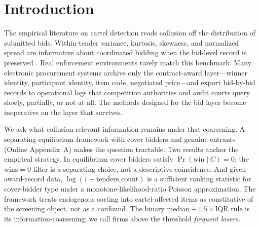 \section{Introduction}
\label{sec:intro}

The empirical literature on cartel detection reads collusion off
the distribution of submitted bids. Within-tender variance,
kurtosis, skewness, and normalized spread are informative about
coordinated bidding when the bid-level record is preserved
\citep{porter1993detection,bajari2003deciding,imhof2019detecting,wallimann2023machine}.
Real enforcement environments rarely match this benchmark. Many
electronic procurement systems archive only the contract-award
layer---winner identity, participant identity, item code,
negotiated price---and export bid-by-bid records to operational
logs that competition authorities and audit courts query slowly,
partially, or not at all. The methods designed for the bid layer
become inoperative on the layer that survives.

We ask what collusion-relevant information remains under that
coarsening. A separating-equilibrium framework with cover
bidders and genuine entrants (Online Appendix~A) makes the
question tractable. Two results anchor the empirical strategy.
In equilibrium cover bidders satisfy
$\Pr(\text{win}\mid C)=0$: the $\text{wins}=0$ filter is a
separating choice, not a descriptive coincidence. And given
award-record data, $\log(1+\text{tenders\_count})$ is a
sufficient ranking statistic for cover-bidder type under a
monotone-likelihood-ratio Poisson approximation. The framework
treats endogenous sorting into cartel-affected items as
constitutive of the screening object, not as a confound. The
binary $\text{median}+1.5\!\times\!\text{IQR}$ rule is its
information-coarsening; we call firms above the threshold
\emph{frequent losers}.

